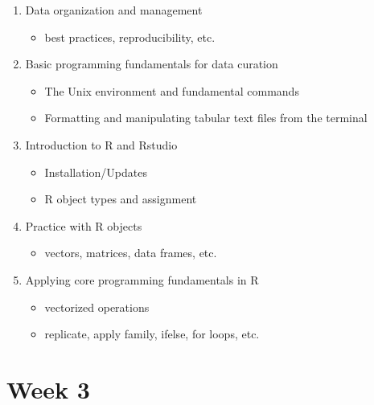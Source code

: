 \documentclass[]{book}
\providecommand{\tightlist}{%
  \setlength{\itemsep}{0pt}\setlength{\parskip}{0pt}}
\begin{document}
\begin{enumerate}
\def\labelenumi{\arabic{enumi}.}
\tightlist
\item
  Data organization and management

  \begin{itemize}
  \tightlist
  \item
    best practices, reproducibility, etc.
  \end{itemize}
\item
  Basic programming fundamentals for data curation

  \begin{itemize}
  \tightlist
  \item
    The Unix environment and fundamental commands
  \item
    Formatting and manipulating tabular text files from the terminal
  \end{itemize}
\item
  Introduction to R and Rstudio

  \begin{itemize}
  \tightlist
  \item
    Installation/Updates
  \item
    R object types and assignment
  \end{itemize}
\item
  Practice with R objects

  \begin{itemize}
  \tightlist
  \item
    vectors, matrices, data frames, etc.
  \end{itemize}
\item
  Applying core programming fundamentals in R

  \begin{itemize}
  \tightlist
  \item
    vectorized operations
  \item
    replicate, apply family, ifelse, for loops, etc.
  \end{itemize}
\end{enumerate}

\hypertarget{week-3}{%
\section{Week 3}\label{week-3}}
\end{document}

